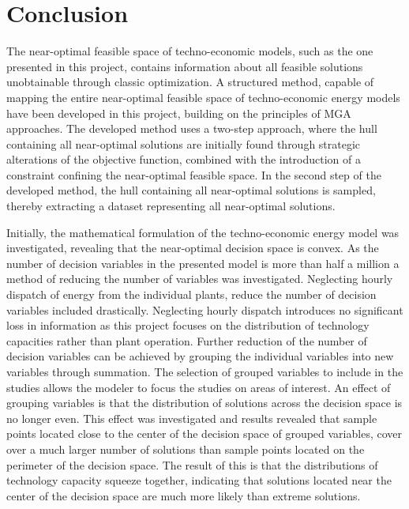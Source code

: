 
\chapter{Conclusion}


The near-optimal feasible space of techno-economic models, such as the one presented in this project, contains information about all feasible solutions unobtainable through classic optimization. A structured method, capable of mapping the entire near-optimal feasible space of techno-economic energy models have been developed in this project, building on the principles of MGA approaches. The developed method uses a two-step approach, where the hull containing all near-optimal solutions are initially found through strategic alterations of the objective function, combined with the introduction of a constraint confining the near-optimal feasible space. In the second step of the developed method, the hull containing all near-optimal solutions is sampled, thereby extracting a dataset representing all near-optimal solutions. 


Initially, the mathematical formulation of the techno-economic energy model was investigated, revealing that the near-optimal decision space is convex. As the number of decision variables in the presented model is more than half a million a method of reducing the number of variables was investigated. Neglecting hourly dispatch of energy from the individual plants, reduce the number of decision variables included drastically. Neglecting hourly dispatch introduces no significant loss in information as this project focuses on the distribution of technology capacities rather than plant operation. Further reduction of the number of decision variables can be achieved by grouping the individual variables into new variables through summation. The selection of grouped variables to include in the studies allows the modeler to focus the studies on areas of interest. An effect of grouping variables is that the distribution of solutions across the decision space is no longer even. This effect was investigated and results revealed that sample points located close to the center of the decision space of grouped variables, cover over a much larger number of solutions than sample points located on the perimeter of the decision space. The result of this is that the distributions of technology capacity squeeze together, indicating that solutions located near the center of the decision space are much more likely than extreme solutions.

